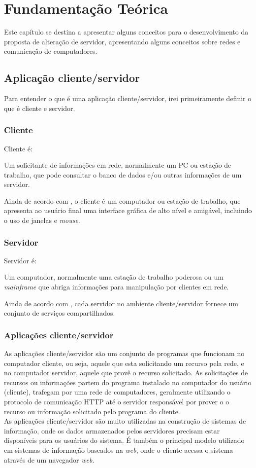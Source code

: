 \chapter{Fundamentação Teórica}\label{fundamentacao-teorica}
Este capítulo se destina a apresentar alguns conceitos para o desenvolvimento da proposta de alteração de servidor, apresentando alguns conceitos sobre redes e comunicação de computadores.

\section{Aplicação cliente/servidor}
Para entender o que é uma aplicação cliente/servidor, irei primeiramente definir o que é cliente e servidor.
\subsection{Cliente}
Cliente é:
\begin{citacao}
Um solicitante de informações em rede, normalmente um PC ou estação de trabalho, que pode consultar o banco de dados e/ou outras informações de um servidor. \cite{stallings2005}
\end{citacao}
Ainda de acordo com , o cliente é um computador ou estação de trabalho, que apresenta ao usuário final uma interface gráfica de alto nível e amigável, incluindo o uso de janelas e \textit{mouse}. 
\subsection{Servidor}
Servidor é:
\begin{citacao}
Um computador, normalmente uma estação de trabalho poderosa ou um \textit{mainframe} que abriga informações para manipulação por clientes em rede. \cite{stallings2005}
\end{citacao}
Ainda de acordo com , cada servidor no ambiente cliente/servidor fornece um conjunto de serviços compartilhados.
\subsection{Aplicações cliente/servidor}
As aplicações cliente/servidor são um conjunto de programas que funcionam no computador cliente, ou seja, aquele que esta solicitando um recurso pela rede, e no computador servidor, aquele que provê o recurso solicitado. As solicitações de recursos ou informações partem do programa instalado no computador do usuário (cliente), trafegam por uma rede de computadores, geralmente utilizando o protocolo de comunicação HTTP até o servidor responsável por prover o o recurso ou informação solicitado pelo programa do cliente.\\
As aplicações cliente/servidor são muito utilizadas na construção de sistemas de informação, onde os dados armazenados pelos servidores precisam estar disponíveis para os usuários do sistema. É também o principal modelo utilizado em sistemas de informação baseados na \textit{web}, onde o cliente acessa o sistema através de um navegador \textit{web}.

